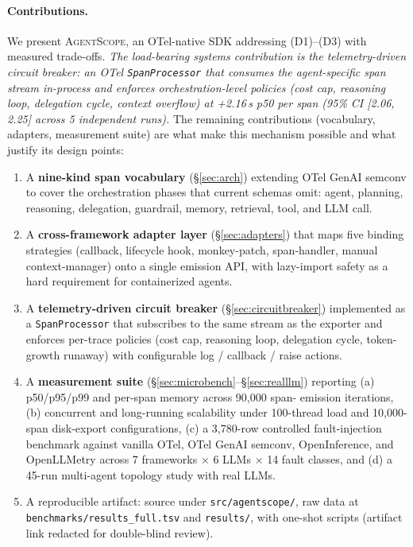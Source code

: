 \documentclass[sigplan,10pt,anonymous,review]{acmart}
\newcommand{\sysname}{\textsc{AgentScope}\xspace}
\begin{document}
\paragraph{Contributions.} We present \sysname, an OTel-native SDK
addressing (D1)--(D3) with measured trade-offs. \emph{The load-bearing
systems contribution is the telemetry-driven circuit breaker: an OTel
\texttt{SpanProcessor} that consumes the agent-specific span stream
in-process and enforces orchestration-level policies (cost cap,
reasoning loop, delegation cycle, context overflow) at +2.16\,\textmu{}s
p50 per span (95\% CI [2.06, 2.25] across 5 independent runs).} The
remaining contributions (vocabulary, adapters, measurement suite) are
what make this mechanism possible and what justify its design points:

\begin{enumerate}
\item A \textbf{nine-kind span vocabulary} (\S\ref{sec:arch}) extending
  OTel GenAI semconv to cover the orchestration phases that current
  schemas omit: agent, planning, reasoning, delegation, guardrail,
  memory, retrieval, tool, and LLM call.
\item A \textbf{cross-framework adapter layer} (\S\ref{sec:adapters})
  that maps five binding strategies (callback, lifecycle hook,
  monkey-patch, span-handler, manual context-manager) onto a single
  emission API, with lazy-import safety as a hard requirement for
  containerized agents.
\item A \textbf{telemetry-driven circuit breaker}
  (\S\ref{sec:circuitbreaker}) implemented as a
  \texttt{SpanProcessor} that subscribes to the same stream as the
  exporter and enforces per-trace policies (cost cap, reasoning loop,
  delegation cycle, token-growth runaway) with configurable
  log / callback / raise actions.
\item A \textbf{measurement suite} (\S\ref{sec:microbench}--\S\ref{sec:realllm})
  reporting (a) p50/p95/p99 and per-span memory across 90{,}000 span-
  emission iterations, (b) concurrent and long-running scalability under
  100-thread load and 10{,}000-span disk-export configurations, (c) a
  3{,}780-row controlled fault-injection benchmark against vanilla OTel,
  OTel GenAI semconv, OpenInference, and OpenLLMetry across 7
  frameworks $\times$ 6 LLMs $\times$ 14 fault classes, and (d) a 45-run
  multi-agent topology study with real LLMs.
\item A reproducible artifact: source under
  \texttt{src/agentscope/}, raw data at
  \texttt{benchmarks/results\_full.tsv} and
  \texttt{results/}, with one-shot scripts (artifact link redacted for
  double-blind review).
\end{enumerate}
\end{document}
